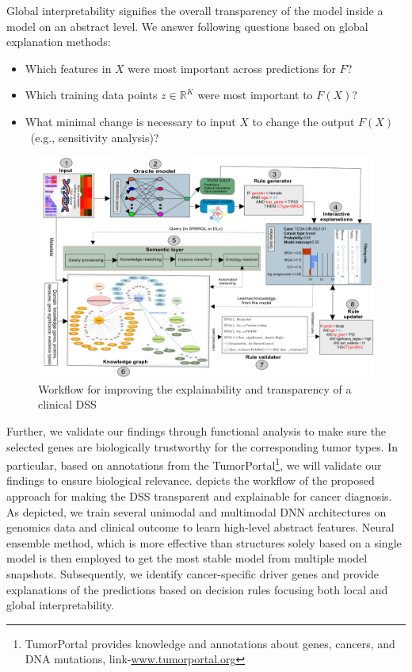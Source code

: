 \hspace*{3.5mm} Global interpretability signifies the overall transparency of the model inside a model on an abstract level. We answer following questions based on global explanation methods: 

\vspace{-2mm}
\begin{itemize}[noitemsep]
    \item Which features in $X$ were most important across predictions for $F$? 
    \item Which training data points $z \in \mathbb{R}^{K}$ were most important to $F(X)$? 
    \item What minimal change is necessary to input $X$ to change the output $F(X)$~(e.g., sensitivity analysis)? 
\end{itemize}
\vspace{-2mm}

\begin{figure}
	\centering
	\includegraphics[width=\textwidth]{images/reasoning_wf.png}	
    \caption{Workflow for improving the explainability and transparency of a clinical DSS}
	\label{fig:wf_overall_approach}
\end{figure}

\hspace*{3.5mm} Further, we validate our findings through functional analysis to make sure the selected genes are biologically trustworthy for the corresponding tumor types. In particular, based on annotations from the TumorPortal\footnote{
TumorPortal provides knowledge and annotations about genes, cancers, and DNA mutations, link-\url{www.tumorportal.org}}, we will validate our findings to ensure biological relevance.  depicts the workflow of the proposed approach for making the DSS transparent and explainable for cancer diagnosis. As depicted, we train several unimodal and multimodal DNN architectures on genomics data and clinical outcome to learn high-level abstract features. Neural ensemble method, which is more effective than structures solely based on a single model is then employed to get the most stable model from multiple model snapshots. Subsequently, we identify cancer-specific driver genes and provide explanations of the predictions based on decision rules focusing both local and global interpretability. 

